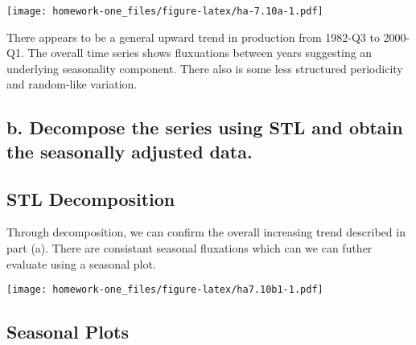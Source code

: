 \documentclass[openany]{book}
\newenvironment{Shaded}{\begin{snugshade}}{\end{snugshade}}
\newcommand{\DataTypeTok}[1]{\textcolor[rgb]{0.13,0.29,0.53}{#1}}
\newcommand{\DecValTok}[1]{\textcolor[rgb]{0.00,0.00,0.81}{#1}}
\newcommand{\KeywordTok}[1]{\textcolor[rgb]{0.13,0.29,0.53}{\textbf{#1}}}
\newcommand{\NormalTok}[1]{#1}
\newcommand{\OperatorTok}[1]{\textcolor[rgb]{0.81,0.36,0.00}{\textbf{#1}}}
\newcommand{\OtherTok}[1]{\textcolor[rgb]{0.56,0.35,0.01}{#1}}
\newcommand{\StringTok}[1]{\textcolor[rgb]{0.31,0.60,0.02}{#1}}
\begin{document}
\texttt{[image: homework-one\_files/figure-latex/ha-7.10a-1.pdf]}

There appears to be a general upward trend in production from 1982-Q3 to 2000-Q1. The overall time series shows fluxuations between years suggesting an underlying seasonality component. There also is some less structured periodicity and random-like variation.

\hypertarget{b.-decompose-the-series-using-stl-and-obtain-the-seasonally-adjusted-data.}{%
\subsection{b. Decompose the series using STL and obtain the seasonally adjusted data.}\label{b.-decompose-the-series-using-stl-and-obtain-the-seasonally-adjusted-data.}}

\hypertarget{stl-decomposition}{%
\subsection{STL Decomposition}\label{stl-decomposition}}

Through decomposition, we can confirm the overall increasing trend described in part (a). There are consistant seasonal fluxations which can we can futher evaluate using a seasonal plot.

\begin{Shaded}
\end{Shaded}

\texttt{[image: homework-one\_files/figure-latex/ha7.10b1-1.pdf]}

\hypertarget{seasonal-plots}{%
\subsection{Seasonal Plots}\label{seasonal-plots}}
\end{document}
